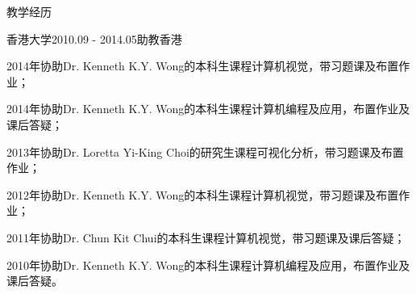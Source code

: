 \documentclass[UTF8]{cv_professional-cn} %
\makeatletter
\newcommand{\specialcell}[2][c]{%
    \begin{tabular}[#1]{@{}l@{}}#2\end{tabular}}
\makeatother
\begin{document}

\begin{rSection}{教学经历}

\begin{rSubsection}{香港大学}{2010.09 - 2014.05}{助教}{香港}
    \item 2014年协助Dr. Kenneth K.Y. Wong的本科生课程计算机视觉，带习题课及布置作业；
    \item 2014年协助Dr. Kenneth K.Y. Wong的本科生课程计算机编程及应用，布置作业及课后答疑；
    \item 2013年协助Dr. Loretta Yi-King Choi的研究生课程可视化分析，带习题课及布置作业；
    \item 2012年协助Dr. Kenneth K.Y. Wong的本科生课程计算机视觉，带习题课及布置作业；
    \item 2011年协助Dr. Chun Kit Chui的本科生课程计算机视觉，带习题课及课后答疑；
    \item 2010年协助Dr. Kenneth K.Y. Wong的本科生课程计算机编程及应用，布置作业及课后答疑。
\end{rSubsection}

\end{rSection}


\end{document}
